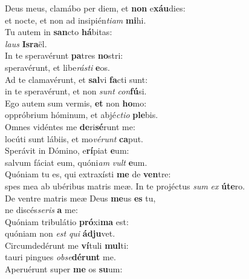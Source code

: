 \evenverse Deus meus, clamábo per diem, et \textbf{non} e\textbf{xáu}dies:~\*\\
\evenverse et nocte, et non ad insipién\textit{ti}\textit{am} \textbf{mi}hi.\\
\oddverse Tu autem in \textbf{san}cto \textbf{há}bitas:~\*\\
\oddverse \textit{laus} \textbf{Is}\textbf{ra}ël.\\
\evenverse In te speravérunt \textbf{pa}tres \textbf{no}stri:~\*\\
\evenverse speravérunt, et libe\textit{rá}\textit{sti} \textbf{e}os.\\
\oddverse Ad te clamavérunt, et \textbf{sal}vi \textbf{fa}cti sunt:~\*\\
\oddverse in te speravérunt, et non \textit{sunt} \textit{con}\textbf{fú}si.\\
\evenverse Ego autem sum vermis, \textbf{et} non \textbf{ho}mo:~\*\\
\evenverse oppróbrium hóminum, et abjé\textit{cti}\textit{o} \textbf{ple}bis.\\
\oddverse Omnes vidéntes me \textbf{de}ri\textbf{sé}runt me:~\*\\
\oddverse locúti sunt lábiis, et mo\textit{vé}\textit{runt} \textbf{ca}put.\\
\evenverse Sperávit in Dómino, e\textbf{rí}piat \textbf{e}um:~\*\\
\evenverse salvum fáciat eum, quóni\textit{am} \textit{vult} \textbf{e}um.\\
\oddverse Quóniam tu es, qui extraxísti \textbf{me} de \textbf{ven}tre:~\*\\
\oddverse spes mea ab ubéribus matris meæ. In te projéctus \textit{sum} \textit{ex} \textbf{ú}\textbf{te}ro.\\
\evenverse De ventre matris meæ Deus \textbf{me}us \textbf{es} tu,~\*\\
\evenverse ne discés\textit{se}\textit{ris} \textbf{a} me:\\
\oddverse Quóniam tribulátio \textbf{pró}xi\textbf{ma} est:~\*\\
\oddverse quóniam non \textit{est} \textit{qui} \textbf{ád}\textbf{ju}vet.\\
\evenverse Circumdedérunt me \textbf{ví}tuli \textbf{mul}ti:~\*\\
\evenverse tauri pingues \textit{ob}\textit{se}\textbf{dé}\textbf{runt} me.\\
\oddverse Aperuérunt super \textbf{me} os \textbf{su}um:~\*\\
